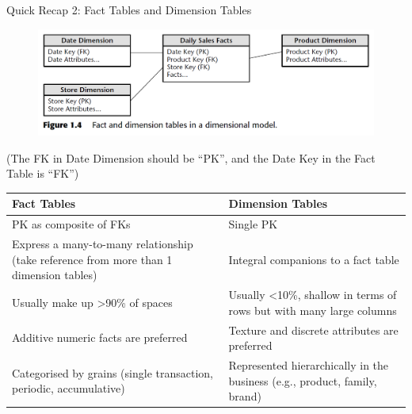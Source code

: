 \begin{frame}[fragile]{Quick Recap 2: Fact Tables and Dimension Tables}
	\vspace{-10pt}
	\begin{figure}
		\includegraphics[width=1\textwidth, trim=0 0 0 0, clip]{t9/images/tables.png}
	\end{figure}
	\vspace{-18pt}
	\begin{center}
		{\tiny (The FK in Date Dimension should be ``PK'', and the Date Key in the Fact Table is ``FK'')}
	\end{center}
	\vspace{-8pt}
	\begin{footnotesize}
	\begin{table}[]
		\begin{tabular}{|p{5.2cm}|p{5.2cm}|}
			\hline
			\textbf{Fact Tables} & \textbf{Dimension Tables}                                                     \\ \hline
			PK as composite of FKs                                                                 & Single PK                                                                     \\ \hline
			Express a many-to-many relationship (take reference from more than 1 dimension tables) & Integral companions to a fact table                                           \\ \hline
			Usually make up \textgreater{}90\% of spaces                                           & Usually \textless{}10\%, shallow in terms of rows but with many large columns \\ \hline
			Additive numeric facts are preferred                                                   & Texture and discrete attributes are preferred                                 \\ \hline
			Categorised by grains (single transaction, periodic, accumulative)                     & Represented hierarchically in the business (e.g., product, family, brand)     \\ \hline
		\end{tabular}
	\end{table}
	\end{footnotesize}	
\end{frame}

